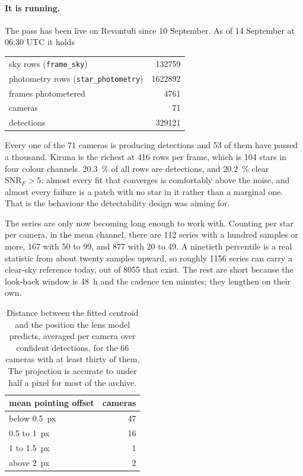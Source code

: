 \documentclass[11pt,a4paper]{article}
\begin{document}
\paragraph{It is running.} The pass has been live on Revontuli since
10 September. As of 14 September at 06:30 UTC it holds

\begin{center}\small
\begin{tabular}{lr}
\toprule
sky rows (\texttt{frame\_sky}) & \num{132759} \\
photometry rows (\texttt{star\_photometry}) & \num{1622892} \\
frames photometered & \num{4761} \\
cameras & \num{71} \\
detections & \num{329121} \\
\bottomrule
\end{tabular}
\end{center}

\noindent Every one of the \num{71} cameras is producing detections and 53 of
them have passed a thousand. Kiruna is the richest at \num{416} rows per frame,
which is \num{104} stars in four colour channels. \SI{20.3}{\percent} of all
rows are detections, and \SI{20.2}{\percent} clear $\mathrm{SNR}_F>5$: almost
every fit that converges is comfortably above the noise, and almost every
failure is a patch with no star in it rather than a marginal one. That is the
behaviour the detectability design was aiming for.

The series are only now becoming long enough to work with. Counting per star per
camera, in the mean channel, there are \num{112} series with a hundred samples
or more, \num{167} with 50 to 99, and \num{877} with 20 to 49. A ninetieth
percentile is a real statistic from about twenty samples upward, so roughly
\num{1156} series can carry a clear-sky reference today, out of \num{8055} that
exist. The rest are short because the look-back window is \SI{48}{\hour} and the
cadence ten minutes; they lengthen on their own.

\begin{table}[h]
\centering
\small
\begin{tabular}{lr}
\toprule
mean pointing offset & cameras \\
\midrule
below \SI{0.5}{px} & 47 \\
\SI{0.5}{} to \SI{1}{px} & 16 \\
\SI{1}{} to \SI{1.5}{px} & 1 \\
above \SI{2}{px} & 2 \\
\bottomrule
\end{tabular}
\caption{Distance between the fitted centroid and the position the lens model
predicts, averaged per camera over confident detections, for the 66 cameras with
at least thirty of them. The projection is accurate to under half a pixel for
most of the archive.}
\label{tab:pointing}
\end{table}
\end{document}
